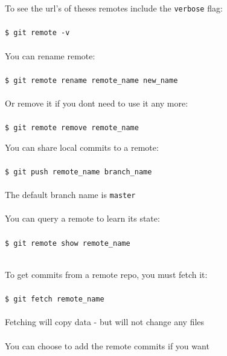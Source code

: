 \documentclass{beamer}
\begin{document}
\begin{frame}[allowframebreaks]{\secname}
    To see the url's of theses remotes include the {\tt verbose} flag: \\~\\

    {\tt \$ git remote -v} \\~\\

    You can rename remote:\\~\\
    {\tt \$ git remote rename remote\_name new\_name} \\~\\

    Or remove it if you dont need to use it any more: \\~\\

    {\tt \$ git remote remove remote\_name}

\framebreak

    You can share local commits to a remote: \\~\\

    {\tt \$ git push remote\_name branch\_name} \\~\\

    The default branch name is {\tt master} \\~\\

    You can query a remote to learn its state: \\~\\

    {\tt \$ git remote show remote\_name} \\~\\

\framebreak

    To get commits from a remote repo, you must fetch it:\\~\\

    {\tt \$ git fetch remote\_name} \\~\\

    Fetching will copy data - but will not change any files\\~\\
    
    You can choose to add the remote commits if you want
\end{frame}
\end{document}
